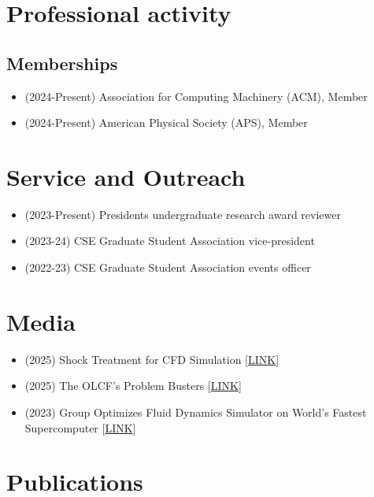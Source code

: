 \documentclass{article}
\begin{document}
\section{Professional activity}

\subsection{Memberships}
\begin{itemize}
    \item[\faChevronRight] (2024-Present) Association for Computing Machinery (ACM), Member
    \item[\faChevronRight] (2024-Present) American Physical Society (APS), Member
\end{itemize}

\section{Service and Outreach}
\begin{itemize}
    \item[\faChevronRight] (2023-Present) Presidents undergraduate research award reviewer
    \item[\faChevronRight] (2023-24) CSE Graduate Student Association vice-president
    \item[\faChevronRight] (2022-23) CSE Graduate Student Association events officer
    \end{itemize}

\section{Media}
\begin{itemize}
    \item[\faNewspaper] (2025) Shock Treatment for CFD Simulation [\href{https://www.olcf.ornl.gov/2025/07/23/shock-treatment-for-cfd-simulations/}{LINK}]
    \item[\faNewspaper] (2025) The OLCF's Problem Busters [\href{https://www.olcf.ornl.gov/2025/02/11/the-olcfs-problem-busters/}{LINK}]
    \item[\faNewspaper] (2023) Group Optimizes Fluid Dynamics Simulator on World’s Fastest Supercomputer [\href{https://www.cc.gatech.edu/news/group-optimizes-fluid-dynamics-simulator-worlds-fastest-supercomputer}{LINK}]
\end{itemize}

\section{Publications}
\end{document}
